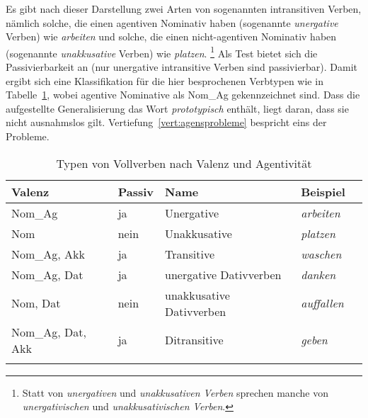 

Es gibt nach dieser Darstellung zwei Arten von sogenannten intransitiven Verben, nämlich solche, die einen agentiven Nominativ haben (sogenannte \textit{unergative} Verben) wie \textit{arbeiten} und solche, die einen nicht-agentiven Nominativ haben (sogenannte \textit{unakkusative} Verben) wie \textit{platzen}.%
\footnote{Statt von \textit{unergativen} und \textit{unakkusativen Verben} sprechen manche von \textit{unergativischen} und \textit{unakkusativischen Verben}.}
Als Test bietet sich die Passivierbarkeit an (nur unergative intransitive Verben sind passivierbar).
Damit ergibt sich eine Klassifikation für die hier besprochenen Verbtypen wie in Tabelle~\ref{tab:vtypen}, wobei agentive Nominative als Nom\_Ag gekennzeichnet sind.
Dass die aufgestellte Generalisierung das Wort \textit{prototypisch} enthält, liegt daran, dass sie nicht ausnahmslos gilt.
Vertiefung~\ref{vert:agensprobleme} bespricht eins der Probleme.

\begin{table}
    \begin{tabular}{lllll}
      \lsptoprule
      \textbf{Valenz} & \textbf{Passiv} & \textbf{Name} & \textbf{Beispiel} \\
      \midrule
      Nom\_Ag & ja & Unergative & \textit{arbeiten} \\
      Nom & nein & Unakkusative & \textit{platzen} \\
      Nom\_Ag, Akk & ja & Transitive & \textit{waschen} \\
      Nom\_Ag, Dat & ja & unergative Dativverben & \textit{danken} \\
      Nom, Dat & nein & unakkusative Dativverben & \textit{auffallen} \\
      Nom\_Ag, Dat, Akk & ja & Ditransitive & \textit{geben} \\
      \lspbottomrule
    \end{tabular}
  \caption{Typen von Vollverben nach Valenz und Agentivität}
  \label{tab:vtypen}
\end{table}

